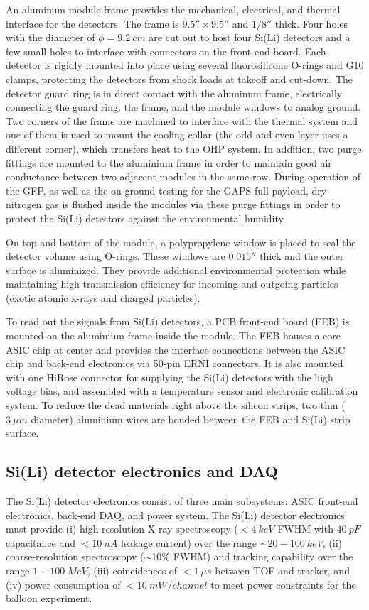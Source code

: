 An aluminum module frame provides the mechanical, electrical, and thermal interface for the detectors. The frame is $9.5'' \times 9.5''$ and $1/8''$ thick. Four holes with the diameter of $\phi = 9.2~cm$ are cut out to host four \ac{Si(Li)} detectors and a few small holes to interface with connectors on the front-end board. Each detector is rigidly mounted into place using several fluorosilicone O-rings and G10 clamps, protecting the detectors from shock loads at takeoff and cut-down. The detector guard ring is in direct contact with the aluminum frame, electrically connecting the guard ring, the frame, and the module windows to analog ground. Two corners of the frame are machined to interface with the thermal system and one of them is used to mount the cooling collar (the odd and even layer uses a different corner), which transfers heat to the OHP system. In addition, two purge fittings are mounted to the aluminium frame in order to maintain good air conductance between two adjacent modules in the same row. During operation of the GFP, as well as the on-ground testing for the \ac{GAPS} full payload, dry nitrogen gas is flushed inside the modules via these purge fittings in order to protect the \ac{Si(Li)} detectors against the environmental humidity.

On top and bottom of the module, a polypropylene window is placed to seal the detector volume using O-rings. These windows are $0.015''$ thick and the outer surface is aluminized. They provide additional environmental protection while maintaining high transmission efficiency for incoming and outgoing particles (exotic atomic x-rays and charged particles).

To read out the signals from \ac{Si(Li)} detectors, a \ac{PCB} front-end board (FEB) \cite{Scotti:2019zu} is mounted on the aluminium frame inside the module. The FEB houses a core ASIC chip at center and provides the interface connections between the ASIC chip and back-end electronics via 50-pin ERNI connectors. It is also mounted with one HiRose connector for supplying the \ac{Si(Li)} detectors with the high voltage bias, and assembled with a temperature sensor and electronic calibration system. To reduce the dead materials right above the silicon strips, two thin ($ 3~\mu m$ diameter) aluminium wires are bonded between the FEB and \ac{Si(Li)} strip surface.

\subsection{Si(Li) detector electronics and DAQ}
\label{chap:GAPS:GFP:DAQ}
The \ac{Si(Li)} detector electronics consist of three main subsystems: ASIC front-end electronics, back-end DAQ, and power system. The \ac{Si(Li)} detector electronics must provide (i) high-resolution X-ray spectroscopy ($<4~keV $ \ac{FWHM} with $ 40~pF$ capacitance and $<10~nA$ leakage current) over the range $\sim20-100~keV$, (ii) coarse-resolution spectroscopy ($\sim$10\% \ac{FWHM}) and tracking capability over the range $ 1-100~MeV $, (iii) coincidences of $ <1~\mu s $ between \ac{TOF} and tracker, and (iv) power consumption of $ <10~mW/channel $ to meet power constraints for the balloon experiment.

